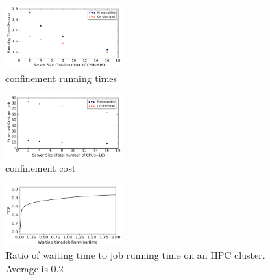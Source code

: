 

\begin{figure}[h]
  \centering
  \includegraphics[width=0.4\textwidth]{../graphs/confin_16_time.pdf}
  \caption{confinement running times}
  \label{fig:confin-16-times}
\end{figure}


\begin{figure}[h]
  \centering
  \includegraphics[width=0.4\textwidth]{../graphs/confin_16_cost.pdf}
  \caption{confinement cost}
  \label{fig:confin-16-cost}
\end{figure}



\begin{figure}
  \includegraphics[width=0.4\textwidth]{../data/waiting_all.pdf}
  \caption{Ratio of waiting time to job running time on an HPC cluster. Average is 0.2}
  \label{fig:hpc-wait-cdf}
\end{figure}


